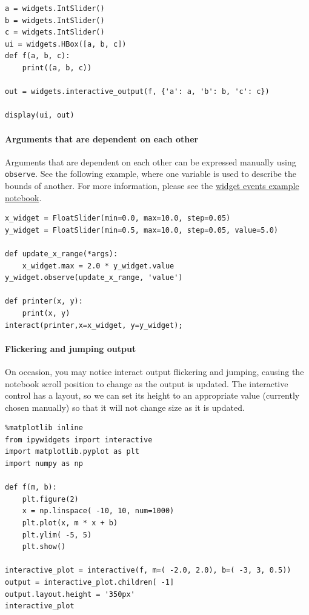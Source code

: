 \begin{verbatim}
a = widgets.IntSlider()
b = widgets.IntSlider()
c = widgets.IntSlider()
ui = widgets.HBox([a, b, c])
def f(a, b, c):
    print((a, b, c))

out = widgets.interactive_output(f, {'a': a, 'b': b, 'c': c})

display(ui, out)
\end{verbatim}

\paragraph{Arguments that are dependent on each other}

Arguments that are dependent on each other can be expressed manually using \texttt{observe}.  See the following example, where one variable is used to describe the bounds of another.  For more information, please see the \href{./Widget\%20Events.ipynb}{widget events example notebook}.

\begin{verbatim}
x_widget = FloatSlider(min=0.0, max=10.0, step=0.05)
y_widget = FloatSlider(min=0.5, max=10.0, step=0.05, value=5.0)

def update_x_range(*args):
    x_widget.max = 2.0 * y_widget.value
y_widget.observe(update_x_range, 'value')

def printer(x, y):
    print(x, y)
interact(printer,x=x_widget, y=y_widget);
\end{verbatim}

\paragraph{Flickering and jumping output}

On occasion, you may notice interact output flickering and jumping, causing the notebook scroll position to change as the output is updated. The interactive control has a layout, so we can set its height to an appropriate value (currently chosen manually) so that it will not change size as it is updated.

\begin{verbatim}
%matplotlib inline
from ipywidgets import interactive
import matplotlib.pyplot as plt
import numpy as np

def f(m, b):
    plt.figure(2)
    x = np.linspace( -10, 10, num=1000)
    plt.plot(x, m * x + b)
    plt.ylim( -5, 5)
    plt.show()

interactive_plot = interactive(f, m=( -2.0, 2.0), b=( -3, 3, 0.5))
output = interactive_plot.children[ -1]
output.layout.height = '350px'
interactive_plot
\end{verbatim}

